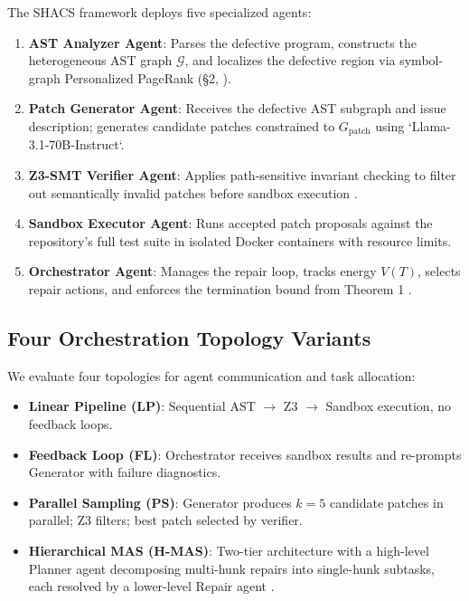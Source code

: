 \documentclass[10pt,journal,compsoc,twocolumn]{IEEEtran}
\begin{document}
The SHACS framework deploys five specialized agents:

\begin{enumerate}
  \item \textbf{AST Analyzer Agent}: Parses the defective program, constructs the heterogeneous AST graph $\mathcal{G}$, and localizes the defective region via symbol-graph Personalized PageRank (\S{}2, \cite{crossref_10_1145_3689096_3689462}).
  \item \textbf{Patch Generator Agent}: Receives the defective AST subgraph and issue description; generates candidate patches constrained to $G_{\text{patch}}$ using `Llama-3.1-70B-Instruct`.
  \item \textbf{Z3-SMT Verifier Agent}: Applies path-sensitive invariant checking to filter out semantically invalid patches before sandbox execution \cite{arxiv_2404_01131}.
  \item \textbf{Sandbox Executor Agent}: Runs accepted patch proposals against the repository's full test suite in isolated Docker containers with resource limits.
  \item \textbf{Orchestrator Agent}: Manages the repair loop, tracks energy $V(T)$, selects repair actions, and enforces the termination bound from Theorem 1 \cite{arxiv_2412_06333}.
\end{enumerate}


\subsection{Four Orchestration Topology Variants}


We evaluate four topologies for agent communication and task allocation:

\begin{itemize}
  \item \textbf{Linear Pipeline (LP)}: Sequential AST $\rightarrow$ Z3 $\rightarrow$ Sandbox execution, no feedback loops.
  \item \textbf{Feedback Loop (FL)}: Orchestrator receives sandbox results and re-prompts Generator with failure diagnostics.
  \item \textbf{Parallel Sampling (PS)}: Generator produces $k = 5$ candidate patches in parallel; Z3 filters; best patch selected by verifier.
  \item \textbf{Hierarchical MAS (H-MAS)}: Two-tier architecture with a high-level Planner agent decomposing multi-hunk repairs into single-hunk subtasks, each resolved by a lower-level Repair agent \cite{arxiv_2412_06333}.
\end{itemize}
\end{document}
